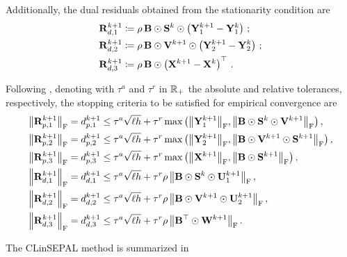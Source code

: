 Additionally, the dual residuals obtained from the stationarity condition are
\begin{equation}\label{eq:dual_res_partial}
    \begin{aligned}        
        \mathbf{R}_{d,1}^{k+1}&\coloneqq \rho \,\mathbf{B}\odot \mathbf{S}^{k} \odot \left(\mathbf{Y}_1^{k+1}-\mathbf{Y}_1^k\right)\,;\\
        \mathbf{R}_{d,2}^{k+1}&\coloneqq \rho \,\mathbf{B}\odot \mathbf{V}^{k+1} \odot \left(\mathbf{Y}_2^{k+1} - \mathbf{Y}_2^k\right)\,;\\ \mathbf{R}_{d,3}^{k+1}&\coloneqq \rho \, \mathbf{B} \odot \left( \mathbf{X}^{k+1}-\mathbf{X}^k\right)^\top\,.
    \end{aligned}
\end{equation}

Following , denoting with $\tau^a$ and $\tau^r$ in $\mathbb{R}_+$ the absolute and relative tolerances, respectively, the stopping criteria to be satisfied for empirical convergence are
\begin{equation}\label{eq:stopping_criteria_partial}
    \begin{aligned}
        \frob{\mathbf{R}_{p,1}^{k+1}}&=d_{p,1}^{k+1}\leq \tau^a \sqrt{\ell h} + \tau^r \max{\left(\frob{\YO^{k+1}}, \frob{\B\odot \Supp^{k} \odot \V^{k+1}}\right)}\,,\\
        \frob{\mathbf{R}_{p,2}^{k+1}}&=d_{p,2}^{k+1}\leq \tau^a \sqrt{\ell h} + \tau^r \max{\left(\frob{\YT^{k+1}}, \frob{\B\odot \V^{k+1} \odot \Supp^{k+1}}\right)}\,,\\
        \frob{\mathbf{R}_{p,3}^{k+1}}&=d_{p,3}^{k+1}\leq \tau^a \sqrt{\ell h} + \tau^r \max{\left(\frob{\X^{k+1}}, \frob{\B \odot \Supp^{k+1}}\right)}\,,\\
        \frob{\mathbf{R}_{d,1}^{k+1}}&=d_{d,1}^{k+1}\leq \tau^a \sqrt{\ell h} + \tau^r \rho\, \frob{\B \odot \Supp^{k} \odot \scaledUO^{k+1}}\,,\\
        \frob{\mathbf{R}_{d,2}^{k+1}}&=d_{d,2}^{k+1}\leq \tau^a \sqrt{\ell h} + \tau^r \rho\, \frob{\B \odot \V^{k+1} \odot \scaledUT^{k+1}}\,,\\
        \frob{\mathbf{R}_{d,3}^{k+1}}&=d_{d,3}^{k+1}\leq \tau^a \sqrt{\ell h} + \tau^r \rho \, \frob{\B^\top \odot \scaledW^{k+1}}\,.\\
    \end{aligned}
\end{equation}

The CLinSEPAL method is summarized in 

